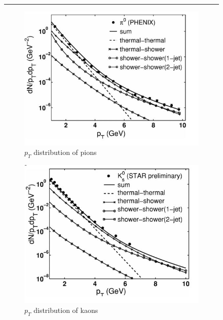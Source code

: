 \begin{figure}
\centering    \rule{35em}{0.5pt}
\begin{subfigure}[b]{0.32\textwidth}
    \centering
    \includegraphics[width=\textwidth]{prevplots/piyieldrecomb.JPG}
    \caption{$p_T$ distribution of pions}
    \label{fig:kyieldrecomb}
\end{subfigure}
\begin{subfigure}[b]{0.32\textwidth}
    \centering
    \includegraphics[width=\textwidth]{prevplots/kyieldrecomb.JPG}
    \caption{$p_T$ distribution of kaons}
    \label{fig:kyieldrecomb}
\end{subfigure}
\begin{subfigure}[b]{0.32\textwidth}

\end{subfigure}
\end{figure}
